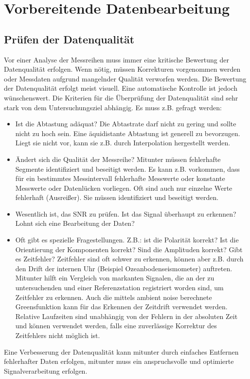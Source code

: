 \chapter{Vorbereitende Datenbearbeitung}

\section{Prüfen der Datenqualität}
Vor einer Analyse der Messreihen muss immer eine kritische Bewertung der Datenqualität erfolgen. Wenn nötig, müssen Korrekturen vorgenommen werden oder Messdaten aufgrund mangelnder Qualität verworfen werden. Die Bewertung der Datenqualität erfolgt meist visuell. Eine automatische Kontrolle ist jedoch wünschenswert. Die Kriterien für die Überprüfung der Datenqualität sind sehr stark von dem Untersuchungsziel abhängig. Es muss z.B. gefragt werden:
\begin{itemize}
\item
Ist die Abtastung adäquat? Die Abtastrate darf nicht zu gering und sollte nicht zu hoch sein. Eine äquidistante Abtastung ist generell zu bevorzugen. Liegt sie nicht vor, kann sie z.B. durch Interpolation hergestellt werden.
\item
Ändert sich die Qualität der Messreihe? Mitunter müssen fehlerhafte Segmente identifiziert und beseitigt werden. Es kann z.B. vorkommen, dass für ein bestimmtes Messintervall fehlerhafte Messwerte oder konstante Messwerte oder Datenlücken vorliegen. Oft sind auch nur einzelne Werte fehlerhaft (Ausreißer). Sie müssen identifiziert und beseitigt werden.
\item
Wesentlich ist, das SNR zu prüfen. Ist das Signal überhaupt zu erkennen? Lohnt sich eine Bearbeitung der Daten?
\item
Oft gibt es spezielle Fragestellungen. Z.B.: ist die Polarität korrekt? Ist die Orientierung der Komponenten korrekt? Sind die Amplituden korrekt? Gibt es Zeitfehler? Zeitfehler sind oft schwer zu erkennen, können aber z.B. durch den Drift der internen Uhr (Beispiel Ozeanbodenseismometer) auftreten. Mitunter hilft ein Vergleich von markanten Signalen, die an der zu untersuchenden und einer Referenzstation registriert worden sind, um Zeitfehler zu erkennen. Auch die mittels ambient noise berechnete Greensfunktion kann für das Erkennen der Zeitdrift verwendet werden. Relative Laufzeiten sind unabhängig von der Fehlern in der absoluten Zeit und können verwendet werden, falls eine zuverlässige Korrektur des Zeitfehlers nicht möglich ist.    
\end{itemize}
Eine Verbesserung der Datenqualität kann mitunter durch einfaches Entfernen fehlerhafter Daten erfolgen, mitunter muss ein anspruchsvolle und optimierte Signalverarbeitung erfolgen. 

